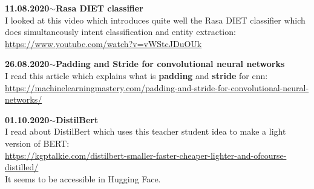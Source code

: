 \documentclass[11pt,a4paper]{article}
\newenvironment{loggentry}[2]%
{\noindent\textbf{#1}\hspace{1cm}$\mathbf{\sim}$\text{ }\textbf{#2}\\}{\vspace{0.5cm}}
\begin{document}
\begin{loggentry}{11.08.2020}{Rasa DIET classifier}

I looked at this video which introduces quite well the Rasa DIET classifier which does simultaneously intent classification and entity extraction:\\
\url{https://www.youtube.com/watch?v=vWStcJDuOUk}

\end{loggentry}


\begin{loggentry}{26.08.2020}{Padding and Stride for convolutional neural networks}

I read this article which explains what is \textbf{padding} and \textbf{stride} for cnn:\\
\url{https://machinelearningmastery.com/padding-and-stride-for-convolutional-neural-networks/}

\end{loggentry}


\begin{loggentry}{01.10.2020}{DistilBert}

I read about DistilBert which uses this teacher student idea to make a light version of BERT:\\
\url{https://kgptalkie.com/distilbert-smaller-faster-cheaper-lighter-and-ofcourse-distilled/}\\
It seems to be accessible in Hugging Face.

\end{loggentry}
\end{document}
